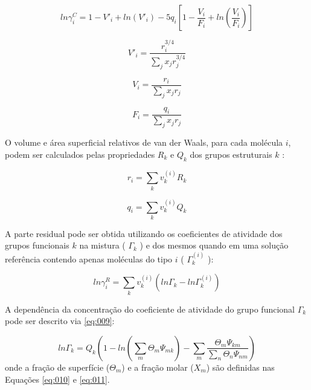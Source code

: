\begin{equation}\label{eq:002}
ln\gamma_i^C = 1 - V'_i + ln(V'_i) - 5q_i\left [ 1
- \frac{V_i}{F_i} + ln\left ( \frac{V_i}{F_i} \right ) \right ]
\end{equation}

\begin{equation}\label{eq:003}
V'_i = \frac{r_i^{3/4}}{\displaystyle\sum_jx_jr_j^{3/4}}
\end{equation}

\begin{equation}\label{eq:004}
V_i = \frac{r_i}{\displaystyle\sum_jx_jr_j}
\end{equation}

\begin{equation}\label{eq:005}
F_i = \frac{q_i}{\displaystyle\sum_jx_jr_j}
\end{equation}

O volume e área superficial relativos de van der Waals, para cada molécula $i$,
podem ser calculados pelas propriedades $R_k$  e $Q_k$  dos grupos estruturais
$k$ :

\begin{equation}\label{eq:006}
r_i = \displaystyle\sum_kv_k^{(i)}R_k
\end{equation}

\begin{equation}\label{eq:007}
q_i = \displaystyle\sum_kv_k^{(i)}Q_k
\end{equation}

A parte residual pode ser obtida utilizando os coeficientes de atividade dos
grupos funcionais $k$  na mistura ( $\Gamma_k$ ) e dos mesmos quando em uma
solução referência contendo apenas moléculas do tipo $i$ ( $\Gamma_k^{(i)}$ ):


\begin{equation}\label{eq:008}
ln\gamma_i^R = \displaystyle\sum_kv^{(i)}_k\left ( ln\Gamma_k -
ln\Gamma_k^{(i)} \right )
\end{equation}

A dependência da concentração do coeficiente de atividade do grupo funcional
$\Gamma_k$ pode ser descrito via \autoref{eq:009}:

\begin{equation}\label{eq:009}
ln\Gamma_k = Q_k\left ( 1 - ln\left ( \displaystyle\sum_m\Theta_m\Psi_{mk}
\right ) -
\displaystyle\sum_m\frac{\Theta_m\Psi_{km}}{\displaystyle\sum_n\Theta_n\Psi_{nm}}
\right )
\end{equation}
onde a fração de superfície ($\Theta_m$) e a fração molar ($X_m$) são definidas
nas Equações \ref{eq:010} e \ref{eq:011}.


